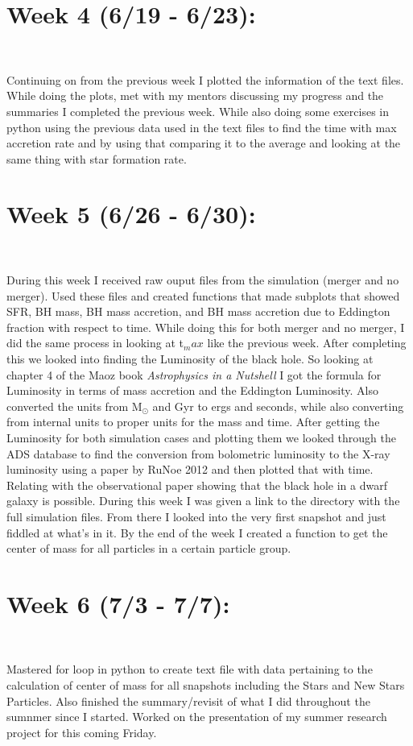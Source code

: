 \documentclass{article}
\begin{document}
\section{Week 4 (6/19 - 6/23):}
\
\par  Continuing on from the previous week I plotted the information of the text files. While doing the plots, met with my mentors discussing my progress and the summaries I completed the previous week. While also doing some exercises in python using the previous data used in the text files to find the time with max accretion rate and by using that comparing it to the average and looking at the same thing with star formation rate.
\section{Week 5 (6/26 - 6/30):}
\
\par  During this week I received raw ouput files from the simulation (merger and no merger). Used these files and created functions that made subplots that showed SFR, BH mass, BH mass accretion, and BH mass accretion due to Eddington fraction with respect to time. While doing this for both merger and no merger, I did the same process in looking at t${_max}$ like the previous week. After completing this we looked into finding the Luminosity of the black hole. So looking at chapter 4 of the Maoz book \textit{Astrophysics in a Nutshell} I got the formula for Luminosity in terms of mass accretion and the Eddington Luminosity. Also converted the units from M${_\odot}$ and Gyr to ergs and seconds, while also converting from internal units to proper units for the mass and time. After getting the Luminosity for both simulation cases and plotting them we looked through the ADS database to find the conversion from bolometric luminosity to the X-ray luminosity using a paper by RuNoe 2012 and then plotted that with time. Relating with the observational paper showing that the black hole in a dwarf galaxy is possible. During this week I was given a link to the directory with the full simulation files. From there I looked into the very first snapshot and just fiddled at what's in it. By the end of the week I created a function to get the center of mass for all particles in a certain particle group.
\section{Week 6 (7/3 - 7/7):}
\
\par  
Mastered for loop in python to create text file with data pertaining to the calculation of center of mass for all snapshots including the Stars and New Stars Particles. Also finished the summary/revisit of what I did throughout the sumnmer since I started. Worked on the presentation of my summer research project for this coming Friday.
\end{document}
